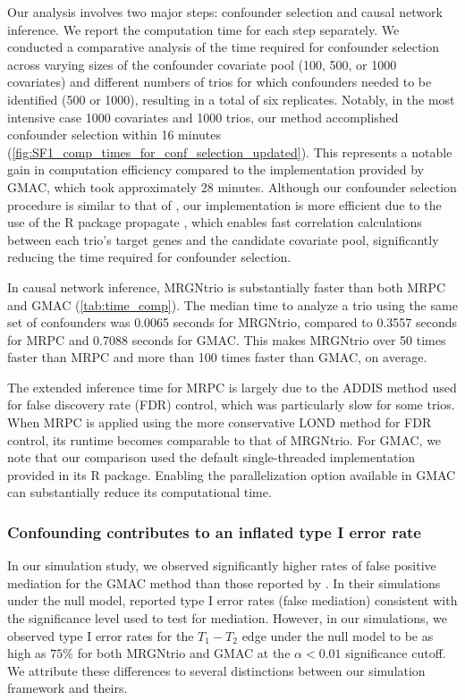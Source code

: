 \documentclass[12pt,letterpaper]{report}
\begin{document}
\begin{doublespace}
Our analysis involves two major steps: confounder selection and causal network inference. We report the computation time for each step separately. We conducted a comparative analysis of the time required for confounder selection across varying sizes of the confounder covariate pool (100, 500, or 1000 covariates) and different numbers of trios for which confounders needed to be identified (500 or 1000), resulting in a total of six replicates. Notably, in the most intensive case 1000 covariates and 1000 trios, our method accomplished confounder selection within 16 minutes (\autoref{fig:SF1_comp_times_for_conf_selection_updated}). This represents a notable gain in computation efficiency compared to the implementation provided by GMAC, which took approximately 28 minutes. Although our confounder selection procedure is similar to that of \cite{yang2017identifying}, our implementation is more efficient due to the use of the R package propagate \cite{spiess2018package}, which enables fast correlation calculations between each trio’s target genes and the candidate covariate pool, significantly reducing the time required for confounder selection.

In causal network inference, MRGNtrio is substantially faster than both MRPC and GMAC (\autoref{tab:time_comp}). The median time to analyze a trio using the same set of confounders was 0.0065 seconds for MRGNtrio, compared to 0.3557 seconds for MRPC and 0.7088 seconds for GMAC. This makes MRGNtrio over 50 times faster than MRPC and more than 100 times faster than GMAC, on average.

The extended inference time for MRPC is largely due to the ADDIS method used for false discovery rate (FDR) control, which was particularly slow for some trios. When MRPC is applied using the more conservative LOND method for FDR control, its runtime becomes comparable to that of MRGNtrio. For GMAC, we note that our comparison used the default single-threaded implementation provided in its R package. Enabling the parallelization option available in GMAC can substantially reduce its computational time.








\subsubsection{Confounding contributes to an inflated type I error rate}

In our simulation study, we observed significantly higher rates of false positive mediation for the GMAC method than those reported by \cite{yang2017identifying}. In their simulations under the null model, \cite{yang2017identifying} reported type I error rates (false mediation) consistent with the significance level used to test for mediation. However, in our simulations, we observed type I error rates for the $T_1 - T_2$ edge under the null model to be as high as $75\%$ for both MRGNtrio and GMAC at the $\alpha < 0.01$ significance cutoff. We attribute these differences to several distinctions between our simulation framework and theirs. 


\end{doublespace}
\end{document}
